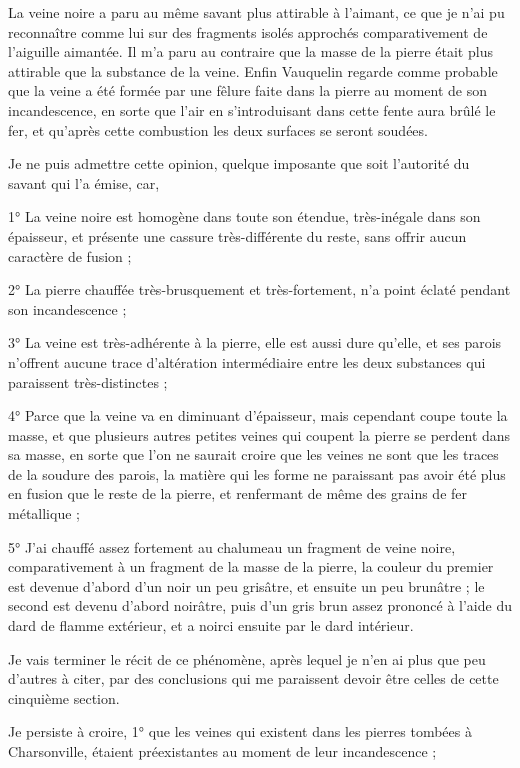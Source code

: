 \documentclass[a4paper, 12pt, oneside, french]{article}
\begin{document}
La veine noire a paru au même savant plus attirable à l'aimant, ce que je n'ai pu reconnaître comme lui sur des fragments isolés approchés comparativement de l'aiguille aimantée. Il m'a paru au contraire que la masse de la pierre était plus attirable que la substance de la veine. Enfin Vauquelin regarde comme probable que la veine a été formée par une fêlure faite dans la pierre au moment de son incandescence, en sorte que l'air en s'introduisant dans cette fente aura brûlé le fer, et qu'après cette combustion les deux surfaces se seront soudées.

Je ne puis admettre cette opinion, quelque imposante que soit l'autorité du savant qui l'a émise, car,

1° La veine noire est homogène dans toute son étendue, très-inégale dans son épaisseur, et présente une cassure très-différente du reste, sans offrir aucun caractère de fusion ;

2° La pierre chauffée très-brusquement et très-fortement, n'a point éclaté pendant son incandescence ;

3° La veine est très-adhérente à la pierre, elle est aussi dure qu'elle, et ses parois n'offrent aucune trace d'altération intermédiaire entre les deux substances qui paraissent très-distinctes ;

4° Parce que la veine va en diminuant d'épaisseur, mais cependant coupe toute la masse, et que plusieurs autres petites veines qui coupent la pierre se perdent dans sa masse, en sorte que l'on ne saurait croire que les veines ne sont que les traces de la soudure des parois, la matière qui les forme ne paraissant pas avoir été plus en fusion que le reste de la pierre, et renfermant de même des grains de fer métallique ;

5° J'ai chauffé assez fortement au chalumeau un fragment de veine noire, comparativement à un fragment de la masse de la pierre, la couleur du premier est devenue d'abord d'un noir un peu grisâtre, et ensuite un peu brunâtre ; le second est devenu d'abord noirâtre, puis d'un gris brun assez prononcé à l'aide du dard de flamme extérieur, et a noirci ensuite par le dard intérieur.

Je vais terminer le récit de ce phénomène, après lequel je n'en ai plus que peu d'autres à citer, par des conclusions qui me paraissent devoir être celles de cette cinquième section.

Je persiste à croire, 1° que les veines qui existent dans les pierres tombées à Charsonville, étaient préexistantes au moment de leur incandescence ;
\end{document}
